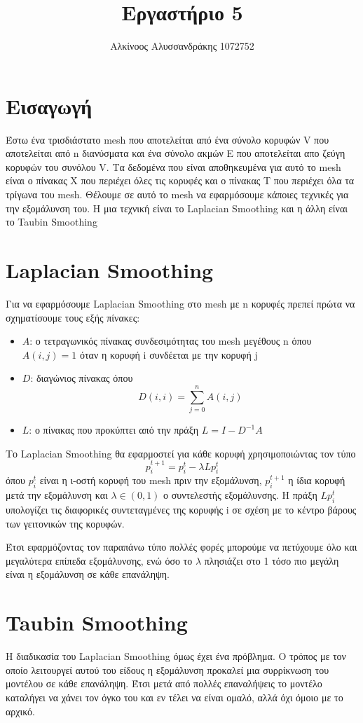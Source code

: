 \documentclass{article}
\title{Εργαστήριο 5}
\author{Αλκίνοος Αλυσσανδράκης 1072752}
\date{}
\begin{document}
\maketitle

\section{Εισαγωγή}
Έστω ένα τρισδιάστατο mesh που αποτελείται από ένα σύνολο κορυφών V που αποτελείται από
n διανύσματα και ένα σύνολο ακμών E που αποτελείται απο ζεύγη κορυφών του συνόλου V.
Τα δεδομένα που είναι αποθηκευμένα για αυτό το mesh είναι ο πίνακας X που περιέχει όλες
τις κορυφές και ο πίνακας T που περιέχει όλα τα τρίγωνα του mesh.
Θέλουμε σε αυτό το mesh να εφαρμόσουμε κάποιες τεχνικές για την εξομάλυνση του. Η μια
τεχνική είναι το Laplacian Smoothing και η άλλη είναι το Taubin Smoothing

\section{Laplacian Smoothing}
Για να εφαρμόσουμε Laplacian Smoothing στο mesh με n κορυφές πρεπεί πρώτα να σχηματίσουμε
τους εξής πίνακες:

\begin{itemize}
	\item $A$: ο τετραγωνικός πίνακας συνδεσιμότητας του mesh μεγέθους n
		όπου $A(i,j) = 1$ όταν η κορυφή i συνδέεται με την κορυφή j
	\item $D$: διαγώνιος πίνακας όπου \[D(i,i) = \sum_{j=0}^{n} A(i, j)\]
	\item $L$: ο πίνακας που προκύπτει από την πράξη $L = I - D^{-1}A$
\end{itemize}

\noindent
Το Laplacian Smoothing θα εφαρμοστεί για κάθε κορυφή χρησιμοποιώντας τον τύπο
\[p_i^{t+1} = p_i^{t} - \lambda Lp_i^{t}\]
όπου $p_i^{t}$ είναι η ι-οστή κορυφή του mesh πριν την εξομάλυνση, $p_i^{t+1}$ η ίδια
κορυφή μετά την εξομάλυνση και $\lambda \in (0, 1)$ ο συντελεστής εξομάλυνσης.
Η πράξη $Lp_i^{t}$ υπολογίζει τις διαφορικές συντεταγμένες της κορυφής i σε σχέση με το
κέντρο βάρους των γειτονικών της κορυφών.

Έτσι εφαρμόζοντας τον παραπάνω τύπο πολλές φορές μπορούμε να πετύχουμε όλο και μεγαλύτερα
επίπεδα εξομάλυνσης, ενώ όσο το $\lambda$ πλησιάζει στο 1 τόσο πιο μεγάλη είναι η
εξομάλυνση σε κάθε επανάληψη.

\section{Taubin Smoothing}
Η διαδικασία του Laplacian Smoothing όμως έχει ένα πρόβλημα. Ο τρόπος με τον οποίο
λειτουργεί αυτού του είδους η εξομάλυνση προκαλεί μια συρρίκνωση του μοντέλου σε
κάθε επανάληψη. Έτσι μετά από πολλές επαναλήψεις το μοντέλο καταλήγει να χάνει
τον όγκο του και εν τέλει να είναι ομαλό, αλλά όχι όμοιο με το αρχικό.
\end{document}
